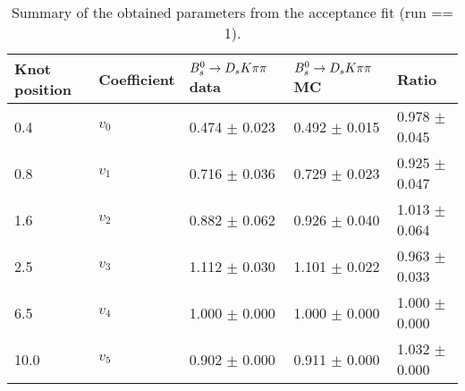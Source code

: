 \begin{table}[h]
\centering
\caption{Summary of the obtained parameters from the acceptance fit (run == 1).} 
\begin{tabular}{l l l l l}
\hline
\hline
Knot position & Coefficient & ${{B}^0_{s}}\rightarrow{\ensuremath{{D}_{s}}}{\ensuremath{K}}{\ensuremath{\pi}}{\ensuremath{\pi}}$ data & ${{B}^0_{s}}\rightarrow{\ensuremath{{D}_{s}}}{\ensuremath{K}}{\ensuremath{\pi}}{\ensuremath{\pi}}$ MC & Ratio \\
\hline
0.4 & $v_{0}$ & 0.474 $\pm$ 0.023 & 0.492 $\pm$ 0.015 & 0.978 $\pm$ 0.045\\
0.8 & $v_{1}$ & 0.716 $\pm$ 0.036 & 0.729 $\pm$ 0.023 & 0.925 $\pm$ 0.047\\
1.6 & $v_{2}$ & 0.882 $\pm$ 0.062 & 0.926 $\pm$ 0.040 & 1.013 $\pm$ 0.064\\
2.5 & $v_{3}$ & 1.112 $\pm$ 0.030 & 1.101 $\pm$ 0.022 & 0.963 $\pm$ 0.033\\
6.5 & $v_{4}$ & 1.000 $\pm$ 0.000 & 1.000 $\pm$ 0.000 & 1.000 $\pm$ 0.000\\
10.0 & $v_{5}$ & 0.902 $\pm$ 0.000 & 0.911 $\pm$ 0.000 & 1.032 $\pm$ 0.000\\
\hline
\hline
\end{tabular}
\label{table:splines}
\end{table}
